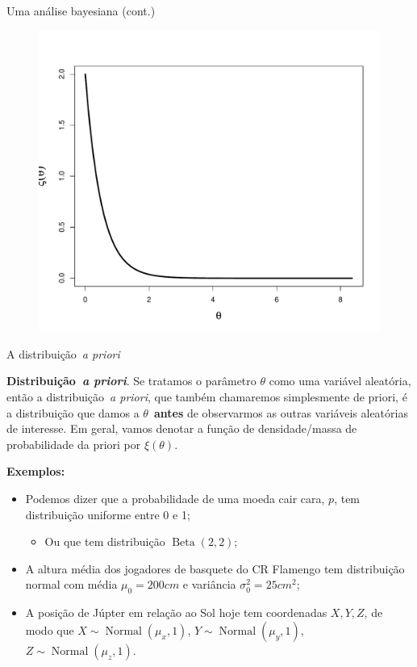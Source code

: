 \begin{frame}{Uma análise bayesiana (cont.)}
 \begin{figure}[!ht]
\label{fig:gamma_1_2}
\begin{center}
\includegraphics[scale=0.4]{figures/gamma_1_2.pdf} 
\end{center} 
\end{figure} 
\end{frame}
\begin{frame}{A distribuição~\textit{a priori}}
\begin{defn}
\label{def:prior}
 \textbf{Distribuição~\textit{a priori}}.
 Se tratamos o parâmetro $\theta$ como uma variável aleatória, então a distribuição~\textit{a priori}, que também chamaremos simplesmente de priori, é a distribuição que damos a $\theta$~\textbf{antes} de observarmos as outras variáveis aleatórias de interesse.
 Em geral, vamos denotar a função de densidade/massa de probabilidade da priori por $\xi(\theta)$.
\end{defn}
\textbf{Exemplos:}
\begin{itemize}
 \item Podemos dizer que a probabilidade de uma moeda cair cara, $p$, tem distribuição uniforme entre 0 e 1;
 \begin{itemize}
  \item Ou que tem distribuição $\operatorname{Beta}(2, 2)$;
 \end{itemize}
 \item A altura média dos jogadores de basquete do CR Flamengo tem distribuição normal com média $\mu_0 = 200 cm$ e variância $\sigma_0^2 = 25 cm^2$;
 \item A posição de Júpter em relação ao Sol hoje tem coordenadas $X,Y, Z$, de modo que $X \sim \operatorname{Normal}(\mu_x, 1)$, $Y \sim \operatorname{Normal}(\mu_y, 1)$, $Z \sim \operatorname{Normal}(\mu_z, 1)$.
\end{itemize}
\end{frame}
